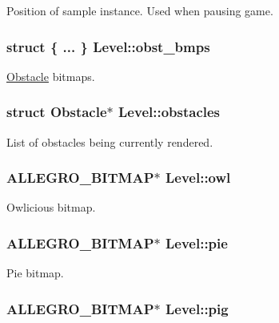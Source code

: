 \-Position of sample instance. \-Used when pausing game. \hypertarget{structLevel_aeb52cb0b931eae0233dd1b50f2c02bf2}{
\subsubsection[{obst\-\_\-bmps}]{\setlength{\rightskip}{0pt plus 5cm}struct \{ ... \}   {\bf \-Level\-::obst\-\_\-bmps}}}\label{structLevel_aeb52cb0b931eae0233dd1b50f2c02bf2}
\hyperlink{structObstacle}{\-Obstacle} bitmaps. \hypertarget{structLevel_a4b4ac826580c681b588dae8ae0dde418}{
\subsubsection[{obstacles}]{\setlength{\rightskip}{0pt plus 5cm}struct {\bf \-Obstacle}$\ast$ {\bf \-Level\-::obstacles}}}\label{structLevel_a4b4ac826580c681b588dae8ae0dde418}
\-List of obstacles being currently rendered. \hypertarget{structLevel_af504e3f628040bc2a2913a50253e856d}{
\subsubsection[{owl}]{\setlength{\rightskip}{0pt plus 5cm}\-A\-L\-L\-E\-G\-R\-O\-\_\-\-B\-I\-T\-M\-A\-P$\ast$ {\bf \-Level\-::owl}}}\label{structLevel_af504e3f628040bc2a2913a50253e856d}
\-Owlicious bitmap. \hypertarget{structLevel_a8910f05e860fca85c96ae45633cc244d}{
\subsubsection[{pie}]{\setlength{\rightskip}{0pt plus 5cm}\-A\-L\-L\-E\-G\-R\-O\-\_\-\-B\-I\-T\-M\-A\-P$\ast$ {\bf \-Level\-::pie}}}\label{structLevel_a8910f05e860fca85c96ae45633cc244d}
\-Pie bitmap. \hypertarget{structLevel_aacde4816ff59c4d9ab6f403758630b8f}{
\subsubsection[{pig}]{\setlength{\rightskip}{0pt plus 5cm}\-A\-L\-L\-E\-G\-R\-O\-\_\-\-B\-I\-T\-M\-A\-P$\ast$ {\bf \-Level\-::pig}}}\label{structLevel_aacde4816ff59c4d9ab6f403758630b8f}
